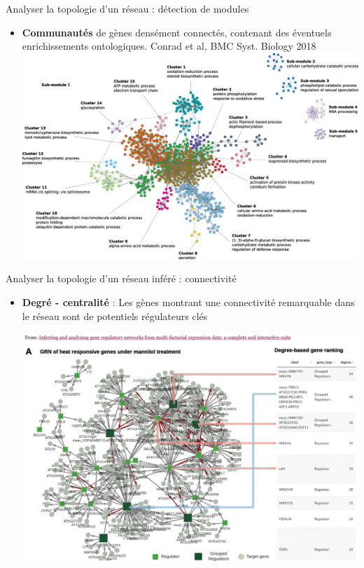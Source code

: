 \begin{frame}{Analyser la topologie d'un réseau : détection de modules}

\begin{itemize}
    \item \small \textbf{Communautés} de gènes densément connectés, contenant des éventuels enrichissements ontologiques. \tiny{Conrad et al, BMC Syst. Biology 2018}
    \center
     \includegraphics[scale = 0.195]{Figures/analyse/modules.png} 
     
    
\end{itemize}
	
\end{frame}


\begin{frame}{Analyser la topologie d'un réseau inféré : connectivité}

\begin{itemize}
 \item \small \textbf{Degré - centralité} : Les gènes montrant une connectivité remarquable dans le réseau sont de potentiels régulateurs clés
 
 \center
     \includegraphics[scale = 0.17]{Figures/analyse/rankingTF.png}
    
\end{itemize}

\end{frame}


